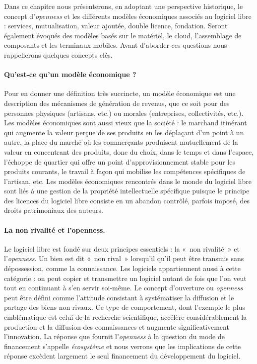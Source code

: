 \documentclass{FramateX}
\begin{document}
\begin{refsection}
Dans ce chapitre nous présenterons, en adoptant une perspective
historique, le concept d'\textit{openness} et les
différents modèles économiques associés au logiciel libre : services,
mutualisation, valeur ajoutée, double licence, fondation. Seront
également évoqués des modèles basés sur le matériel, le cloud,
l'assemblage de composants et les terminaux mobiles.
Avant d'aborder ces questions nous rappellerons quelques concepts
clés.

\paragraph{Qu'est-ce qu'un modèle économique ?} Pour en donner une définition très succincte, un modèle économique est
une description des mécanismes de génération de revenus, que ce soit
pour des personnes physiques (artisans, etc.) ou morales (entreprises,
collectivités, etc.). Les modèles économiques sont aussi vieux que la
société : le marchand itinérant qui augmente la valeur perçue de ses
produits en les déplaçant d'un point à un autre, la
place du marché où les commerçants produisent mutuellement de la valeur
en concentrant des produits, donc du choix, dans le temps et dans
l'espace, l'échoppe de quartier qui
offre un point d'approvisionnement stable pour les produits courants,
le travail à façon qui mobilise les compétences spécifiques de
l'artisan, etc. Les modèles économiques rencontrés dans le monde du
logiciel libre sont liés à une gestion de la propriété intellectuelle
spécifique puisque le principe des licences du logiciel libre consiste
en un abandon contrôlé, parfois imposé, des droits patrimoniaux des
auteurs.

\paragraph{La non rivalité et l'openness.}
Le logiciel libre est fondé sur deux principes essentiels : la «~non
rivalité~» et l'\textit{openness}. Un bien est dit «~non rival~»
lorsqu'il qu'il peut être transmis sans dépossession, comme la
connaissance. Les logiciels appartiennent aussi à cette catégorie : on
peut copier et transmettre un logiciel autant de fois que l'on veut
tout en continuant à s'en servir soi-même. Le concept d'ouverture ou
\textit{openness} peut être défini comme l'attitude consistant à
systématiser la diffusion et le partage des biens non rivaux. Ce type
de comportement, dont l'exemple le plus emblématique est celui de la
recherche scientifique, accélère considérablement la production et la
diffusion des connaissances et augmente significativement l'innovation.
La réponse que fournit l'\textit{openness} à la question du mode de
financement s'appelle \textit{écosystème} et nous verrons que les
implications de cette réponse excèdent largement le seul financement du
développement du logiciel.


\end{refsection}
\end{document}
